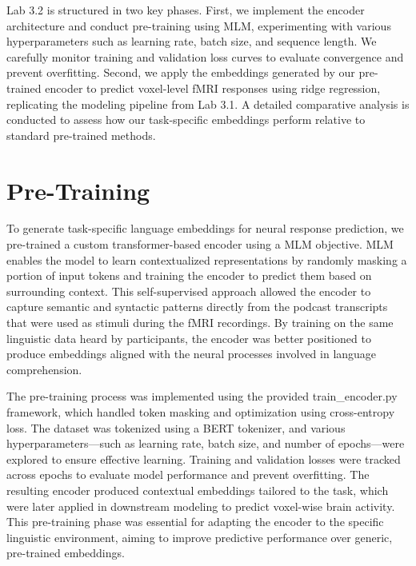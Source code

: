 \documentclass[11pt,letterpaper]{article}
\begin{document}
Lab 3.2 is structured in two key phases. First, we implement the encoder architecture and conduct pre-training using MLM, experimenting with various hyperparameters such as learning rate, batch size, and sequence length. We carefully monitor training and validation loss curves to evaluate convergence and prevent overfitting. Second, we apply the embeddings generated by our pre-trained encoder to predict voxel-level fMRI responses using ridge regression, replicating the modeling pipeline from Lab 3.1. A detailed comparative analysis is conducted to assess how our task-specific embeddings perform relative to standard pre-trained methods.

\vspace{1em} %
\section{Pre-Training}
\vspace{0.5em} %

To generate task-specific language embeddings for neural response prediction, we pre-trained a custom transformer-based encoder using a MLM objective. MLM enables the model to learn contextualized representations by randomly masking a portion of input tokens and training the encoder to predict them based on surrounding context. This self-supervised approach allowed the encoder to capture semantic and syntactic patterns directly from the podcast transcripts that were used as stimuli during the fMRI recordings. By training on the same linguistic data heard by participants, the encoder was better positioned to produce embeddings aligned with the neural processes involved in language comprehension.

The pre-training process was implemented using the provided train\_encoder.py framework, which handled token masking and optimization using cross-entropy loss. The dataset was tokenized using a BERT tokenizer, and various hyperparameters—such as learning rate, batch size, and number of epochs—were explored to ensure effective learning. Training and validation losses were tracked across epochs to evaluate model performance and prevent overfitting. The resulting encoder produced contextual embeddings tailored to the task, which were later applied in downstream modeling to predict voxel-wise brain activity. This pre-training phase was essential for adapting the encoder to the specific linguistic environment, aiming to improve predictive performance over generic, pre-trained embeddings.
\end{document}
